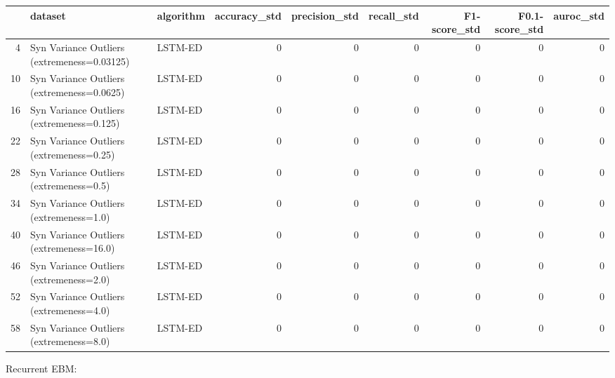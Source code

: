 \begin{tabular}{rllrrrrrr}
\hline
    & dataset                                     & algorithm   &   accuracy\_std &   precision\_std &   recall\_std &   F1-score\_std &   F0.1-score\_std &   auroc\_std \\
\hline
  4 & Syn Variance Outliers (extremeness=0.03125) & LSTM-ED     &              0 &               0 &            0 &              0 &                0 &           0 \\
 10 & Syn Variance Outliers (extremeness=0.0625)  & LSTM-ED     &              0 &               0 &            0 &              0 &                0 &           0 \\
 16 & Syn Variance Outliers (extremeness=0.125)   & LSTM-ED     &              0 &               0 &            0 &              0 &                0 &           0 \\
 22 & Syn Variance Outliers (extremeness=0.25)    & LSTM-ED     &              0 &               0 &            0 &              0 &                0 &           0 \\
 28 & Syn Variance Outliers (extremeness=0.5)     & LSTM-ED     &              0 &               0 &            0 &              0 &                0 &           0 \\
 34 & Syn Variance Outliers (extremeness=1.0)     & LSTM-ED     &              0 &               0 &            0 &              0 &                0 &           0 \\
 40 & Syn Variance Outliers (extremeness=16.0)    & LSTM-ED     &              0 &               0 &            0 &              0 &                0 &           0 \\
 46 & Syn Variance Outliers (extremeness=2.0)     & LSTM-ED     &              0 &               0 &            0 &              0 &                0 &           0 \\
 52 & Syn Variance Outliers (extremeness=4.0)     & LSTM-ED     &              0 &               0 &            0 &              0 &                0 &           0 \\
 58 & Syn Variance Outliers (extremeness=8.0)     & LSTM-ED     &              0 &               0 &            0 &              0 &                0 &           0 \\
\hline
\end{tabular}

Recurrent EBM:

